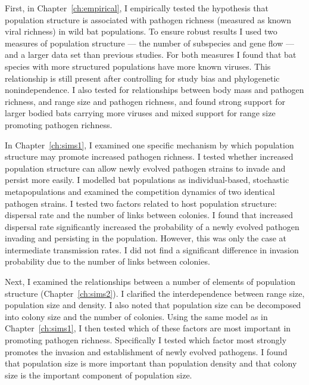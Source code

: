 
First, in Chapter~\ref{ch:empirical}, I empirically tested the hypothesis that population structure is associated with pathogen richness (measured as known viral richness) in wild bat populations.
To ensure robust results I used two measures of population structure --- the number of subspecies and gene flow --- and a larger data set than previous studies.
For both measures I found that bat species with more structured populations have more known viruses.
This relationship is still present after controlling for study bias and phylogenetic nonindependence.
I also tested for relationships between body mass and pathogen richness, and range size and pathogen richness, and found strong support for larger bodied bats carrying more viruses and mixed support for range size promoting pathogen richness.


In Chapter~\ref{ch:sims1}, I examined one specific mechanism by which population structure may promote increased pathogen richness.
I tested whether increased population structure can allow newly evolved pathogen strains to invade and persist more easily.
I modelled bat populations as individual-based, stochastic metapopulations and examined the competition dynamics of two identical pathogen strains.
I tested two factors related to host population structure: dispersal rate and the number of links between colonies.
I found that increased dispersal rate significantly increased the probability of a newly evolved pathogen invading and persisting in the population.
However, this was only the case at intermediate transmission rates.
I did not find a significant difference in invasion probability due to the number of links between colonies.


Next, I examined the relationships between a number of elements of population structure (Chapter~\ref{ch:sims2}).
I clarified the interdependence between range size, population size and density.
I also noted that population size can be decomposed into colony size and the number of colonies.
Using the same model as in Chapter~\ref{ch:sims1}, I then tested which of these factors are most important in promoting pathogen richness.
Specifically I tested which factor most strongly promotes the invasion and establishment of newly evolved pathogens.
I found that population size is more important than population density and that colony size is the important component of population size.


